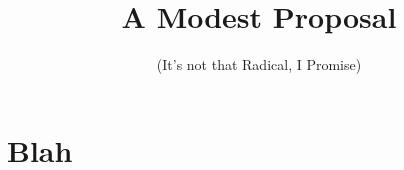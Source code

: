 \documentclass{essay}
\title{A Modest Proposal}
\subtitle{(It's not that Radical, I Promise)}
\begin{document}
\maketitle

\begin{abstract}
\lipsum[2]
\end{abstract}

\section*{Blah}
\lipsum[5]
\end{document}
